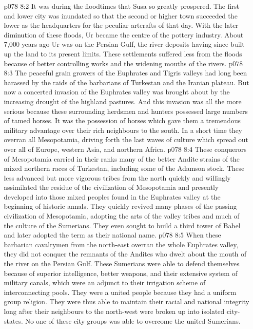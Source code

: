 \vs p078 8:2 It was during the floodtimes that Susa so greatly prospered. The first and lower city was inundated so that the second or higher town succeeded the lower as the headquarters for the peculiar artcrafts of that day. With the later diminution of these floods, Ur became the centre of the pottery industry. About 7,000 years ago Ur was on the Persian Gulf, the river deposits having since built up the land to its present limits. These settlements suffered less from the floods because of better controlling works and the widening mouths of the rivers.
\vs p078 8:3 \pc The peaceful grain growers of the Euphrates and Tigris valleys had long been harassed by the raids of the barbarians of Turkestan and the Iranian plateau. But now a concerted invasion of the Euphrates valley was brought about by the increasing drought of the highland pastures. And this invasion was all the more serious because these surrounding herdsmen and hunters possessed large numbers of tamed horses. It was the possession of horses which gave them a tremendous military advantage over their rich neighbours to the south. In a short time they overran all Mesopotamia, driving forth the last waves of culture which spread out over all of Europe, western Asia, and northern Africa.
\vs p078 8:4 These conquerors of Mesopotamia carried in their ranks many of the better Andite strains of the mixed northern races of Turkestan, including some of the Adamson stock. These less advanced but more vigorous tribes from the north quickly and willingly assimilated the residue of the civilization of Mesopotamia and presently developed into those mixed peoples found in the Euphrates valley at the beginning of historic annals. They quickly revived many phases of the passing civilization of Mesopotamia, adopting the arts of the valley tribes and much of the culture of the Sumerians. They even sought to build a third tower of Babel and later adopted the term as their national name.
\vs p078 8:5 When these barbarian cavalrymen from the north\hyp{}east overran the whole Euphrates valley, they did not conquer the remnants of the Andites who dwelt about the mouth of the river on the Persian Gulf. These Sumerians were able to defend themselves because of superior intelligence, better weapons, and their extensive system of military canals, which were an adjunct to their irrigation scheme of interconnecting pools. They were a united people because they had a uniform group religion. They were thus able to maintain their racial and national integrity long after their neighbours to the north\hyp{}west were broken up into isolated city\hyp{}states. No one of these city groups was able to overcome the united Sumerians.
